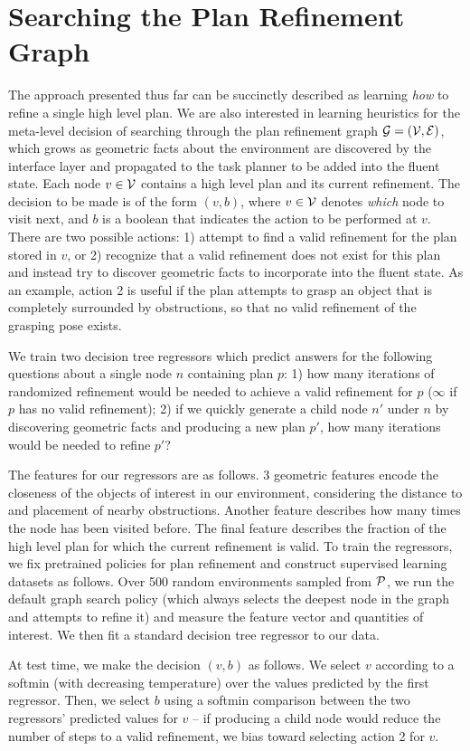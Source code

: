 \section{Searching the Plan Refinement Graph}
The approach presented thus far can be succinctly described as learning \emph{how} to
refine a single high level plan. We are also interested in learning heuristics for the
meta-level decision of searching through the plan refinement graph $\mathcal{G} = (\mathcal{V}, \mathcal{E})$, which grows as geometric
facts about the environment are discovered by the interface layer and propagated to the
task planner to be added into the fluent state. Each node $v \in \mathcal{V}$ contains a high level plan and its current
refinement. The decision to be made is of the form $(v, b)$,
where $v \in \mathcal{V}$ denotes \emph{which} node to visit next, and $b$ is a boolean that indicates the action
to be performed at $v$. There are two possible actions: 1) attempt to find a valid refinement
for the plan stored in $v$, or 2) recognize that a valid refinement does not exist for this plan
and instead try to discover geometric facts to incorporate into the fluent state. As an example, action 2
is useful if the plan attempts to grasp an object that is completely surrounded by obstructions,
so that no valid refinement of the grasping pose exists.

We train two decision tree regressors which predict answers for the
following questions about a single node $n$ containing plan $p$: 1) how many iterations of randomized refinement
would be needed to achieve a valid refinement for $p$ ($\infty$ if $p$ has no valid refinement); 2)
if we quickly generate a child node $n'$ under $n$ by discovering geometric facts and producing a new plan $p'$,
how many iterations would be needed to refine $p'$?

The features for our regressors are as follows. 3 geometric features encode the closeness of the objects
of interest in our environment, considering the distance to and placement of nearby obstructions. Another
feature describes how many times the node has been visited before. The final feature describes the fraction
of the high level plan for which the current refinement is valid. To train the regressors, we fix pretrained policies for
plan refinement and construct supervised learning datasets as follows.
Over 500 random environments sampled from $\mathcal{P}$, we run the default graph search policy (which always selects
the deepest node in the graph and attempts to refine it) and measure the feature vector and
quantities of interest. We then fit a standard decision tree regressor to our data.

At test time, we make the decision $(v, b)$ as follows. We select $v$ according to a softmin (with decreasing temperature) over the values
predicted by the first regressor. Then, we select $b$ using a softmin comparison between the two regressors'
predicted values for $v$ -- if producing a child node would reduce the number of steps to a valid refinement,
we bias toward selecting action 2 for $v$.
